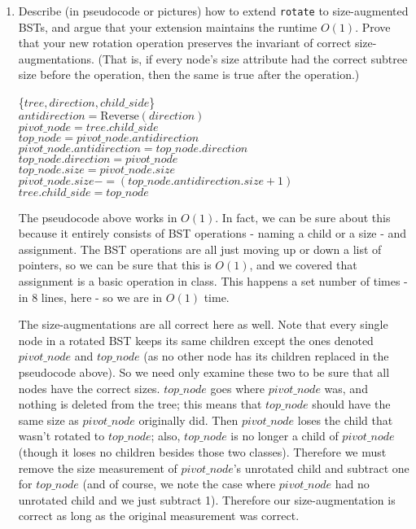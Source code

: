 \documentclass[11pt]{article}
\begin{document}
\begin{enumerate}
\begin{enumerate}
        \item Describe (in pseudocode or pictures) how to extend \texttt{rotate} to size-augmented BSTs, and argue that your extension maintains the runtime $O(1)$. Prove that your new rotation operation preserves the invariant of correct size-augmentations. (That is, if every node's size attribute had the correct subtree size before the operation, then the same is true after the operation.)

\begin{algorithm}[H]
 \{$tree, direction, child\_side$\}\\
$antidirection = \text{Reverse}(direction)$ \\
$pivot\_node = tree.child\_side$ \\
$top\_node = pivot\_node.antidirection$ \\
$pivot\_node.antidirection = top\_node.direction$ \\
$top\_node.direction = pivot\_node$ \\
$top\_node.size = pivot\_node.size$ \\
$pivot\_node.size -= (top\_node.antidirection.size + 1)$ \\
$tree.child\_side = top\_node$ \\
\end{algorithm}

The pseudocode above works in $O(1)$. In fact, we can be sure about this because it entirely consists of BST operations - naming a child or a size - and assignment. The BST operations are all just moving up or down a list of pointers, so we can be sure that this is $O(1)$, and we covered that assignment is a basic operation in class. This happens a set number of times - in 8 lines, here - so we are in $O(1)$ time.

The size-augmentations are all correct here as well. Note that every single node in a rotated BST keeps its same children except the ones denoted $pivot\_node$ and $top\_node$ (as no other node has its children replaced in the pseudocode above). So we need only examine these two to be sure that all nodes have the correct sizes. $top\_node$ goes where $pivot\_node$ was, and nothing is deleted from the tree; this means that $top\_node$ should have the same size as $pivot\_node$ originally did. Then $pivot\_node$ loses the child that wasn't rotated to $top\_node$; also, $top\_node$ is no longer a child of $pivot\_node$ (though it loses no children besides those two classes). Therefore we must remove the size measurement of $pivot\_node$'s unrotated child and subtract one for $top\_node$ (and of course, we note the case where $pivot\_node$ had no unrotated child and we just subtract 1). Therefore our size-augmentation is correct as long as the original measurement was correct.
        

\end{enumerate}
\end{enumerate}
\end{document}
